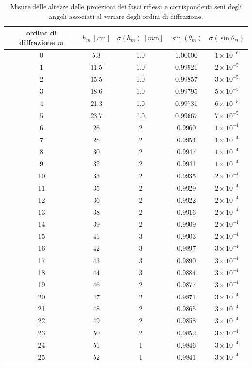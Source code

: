 \documentclass[10pt, a4paper, italian]{article}
\begin{document}
\begin{table}[htbp]
\centering
\begin{tabular}{ccccc}
\toprule
ordine di diffrazione $m$ & $h_m \; [\si{c\m}]$ &
$\sigma (h_m) \; [\si{m\m}]$ & $\sin(\theta _m)$ & $\sigma(\sin{\theta _m})$ \\
\midrule
\midrule
0  & 5.3 & 1.0 & 1.00000 & $1 \times 10^{-6}$ \\
1  & 11.5 & 1.0 & 0.99921 & $2 \times 10^{-5}$ \\
2  & 15.5 & 1.0 & 0.99857 & $3 \times 10^{-5}$ \\
3  & 18.6 & 1.0 & 0.99795 & $5 \times 10^{-5}$ \\
4  & 21.3 & 1.0 & 0.99731 & $6 \times 10^{-5}$ \\
5  & 23.7 & 1.0 & 0.99667 & $7 \times 10^{-5}$ \\
6  & 26 & 2 & 0.9960 & $1 \times 10^{-4}$ \\
7  & 28 & 2 & 0.9954 & $1 \times 10^{-4}$ \\
8  & 30 & 2 & 0.9947 & $1 \times 10^{-4}$ \\
9  & 32 & 2 & 0.9941 & $1 \times 10^{-4}$ \\
10 & 33 & 2 & 0.9935 & $2 \times 10^{-4}$ \\
11 & 35 & 2 & 0.9929 & $2 \times 10^{-4}$ \\
12 & 36 & 2 & 0.9922 & $2 \times 10^{-4}$ \\
13 & 38 & 2 & 0.9916 & $2 \times 10^{-4}$ \\
14 & 39 & 2 & 0.9909 & $2 \times 10^{-4}$ \\
15 & 41 & 3 & 0.9903 & $2 \times 10^{-4}$ \\
16 & 42 & 3 & 0.9897 & $3 \times 10^{-4}$ \\
17 & 43 & 3 & 0.9890 & $3 \times 10^{-4}$ \\
18 & 44 & 3 & 0.9884 & $3 \times 10^{-4}$ \\
19 & 46 & 2 & 0.9877 & $3 \times 10^{-4}$ \\
20 & 47 & 2 & 0.9871 & $3 \times 10^{-4}$ \\
21 & 48 & 2 & 0.9865 & $3 \times 10^{-4}$ \\
22 & 49 & 2 & 0.9858 & $3 \times 10^{-4}$ \\
23 & 50 & 2 & 0.9852 & $3 \times 10^{-4}$ \\
24 & 51 & 1 & 0.9846 & $3 \times 10^{-4}$ \\
25 & 52 & 1 & 0.9841 & $3 \times 10^{-4}$ \\
\bottomrule
\end{tabular}
\caption{Misure delle altezze delle proiezioni dei fasci riflessi e
corrispondenti seni degli angoli associati al variare degli ordini di
diffrazione. \label{tab: hm}}
\end{table}
\end{document}
